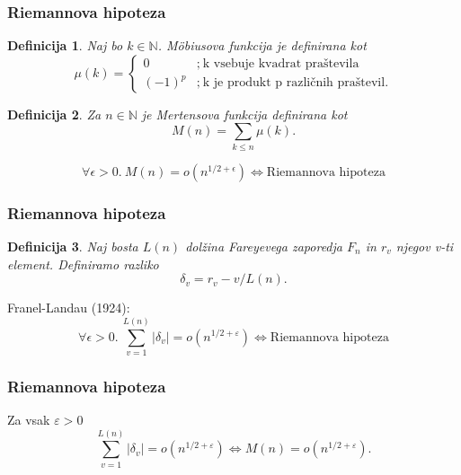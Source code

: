\documentclass{beamer}
\newtheorem{definicija}{Definicija}
\begin{document}
\begin{frame}
\frametitle{Riemannova hipoteza}

\begin{definicija}
Naj bo $k\in\mathbb{N}$. \emph{M\"obiusova funkcija} je definirana kot
\[
\mu(k) = \left\{
\begin{array}{rl}
0 & ;\ \mbox{k vsebuje kvadrat praštevila}\\
(-1)^p & ;\  \mbox{k je produkt p različnih praštevil.}
\end{array}
\right.
\]
\end{definicija}

\pause
\begin{definicija}
Za $n\in\mathbb{N}$ je \emph{Mertensova funkcija} definirana kot
\[ M(n)=\sum_{k\leq n}\mu(k).\]
\end{definicija}

\pause
\[ \forall\epsilon>0.\ M(n) = o(n^{1/2+\epsilon}) \iff \textrm{Riemannova hipoteza} \]

\end{frame}


\begin{frame}
\frametitle{Riemannova hipoteza}

\begin{definicija}
Naj bosta $L(n)$ dolžina Fareyevega zaporedja $F_{n}$ in $r_{v}$ njegov v-ti element. Definiramo razliko
\[ \delta_{v}= r_{v}-v/L(n). \]
\end{definicija}

\pause
Franel-Landau (1924):
\[ \forall\epsilon>0.\ \sum_{v=1}^{L(n)}|\delta_{v}| = o(n^{1/2+\varepsilon}) \iff \textrm{Riemannova hipoteza} \]

\end{frame}


\begin{frame}
\frametitle{Riemannova hipoteza}

Za vsak $\varepsilon > 0$ 
\[ \sum_{v=1}^{L(n)}|\delta_{v}| = o(n^{1/2+\varepsilon}) \iff M(n) = o(n^{1/2+\varepsilon}). \]

\end{frame}

\end{document}
